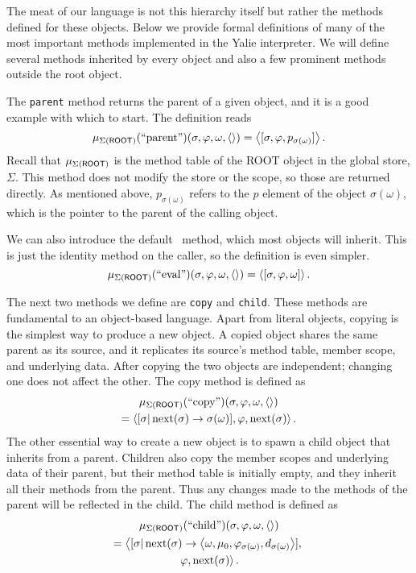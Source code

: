 \documentclass[twocolumn]{article}
\begin{document}
The meat of our language is not this hierarchy itself but rather the
methods defined for these objects. Below we provide formal definitions
of many of the most important methods implemented in the Yalie
interpreter. We will define several methods inherited by every object
and also a few prominent methods outside the root object.

The \texttt{parent} method returns the parent of a given object, and
it is a good example with which to start. The definition reads
\[ \mu_{\Sigma(\text{\sf ROOT})}(\text{``parent''})(\sigma,\varphi,\omega,
\left<\right>) = \left< [\sigma,\varphi,p_{\sigma(\omega)}] \right>. \] Recall that
$\mu_{\Sigma(\text{\sf ROOT})}$ is the method table of the {\ptr ROOT}
object in the global store, $\Sigma$. This method does not modify the
store or the scope, so those are returned directly. As mentioned
above, $p_{\sigma(\omega)}$ refers to the $p$ element of the object
$\sigma(\omega)$, which is the pointer to the parent of the calling
object.

We can also introduce the default \eval\ method, which most objects
will inherit. This is just the identity method on the caller, so the
definition is even simpler.
\[ \mu_{\Sigma(\text{\sf ROOT})}(\text{``eval''})(\sigma,\varphi,\omega,
\left<\right>) = \left< [\sigma,\varphi,\omega] \right>. \]

The next two methods we define are \texttt{copy} and
\texttt{child}. These methods are fundamental to an object-based
language. Apart from literal objects, copying is the simplest way to
produce a new object. A copied object shares the same parent as its
source, and it replicates its source's method table, member scope, and
underlying data. After copying the two objects are independent;
changing one does not affect the other. The copy method is defined as
\begin{multline*}
  \mu_{\Sigma(\text{\sf ROOT})}(\text{``copy''})(\sigma,\varphi,\omega,
\left<\right>) \\ = \left< [\sigma|\operatorname{next}(\sigma)\rightarrow\sigma(\omega)],\varphi,
\operatorname{next}(\sigma)\right>.
\end{multline*}
The other essential way to create a new object is to spawn a child
object that inherits from a parent. Children also copy the member
scopes and underlying data of their parent, but their method table is
initially empty, and they inherit all their methods from the
parent. Thus any changes made to the methods of the parent will be
reflected in the child. The child method is defined as
\begin{multline*}
  \mu_{\Sigma(\text{\sf ROOT})}(\text{``child''})(\sigma,\varphi,\omega,
  \left<\right>) \\ = \left< [\sigma|\operatorname{next}(\sigma)\rightarrow \left< \omega, \mu_0,
  \varphi_{\sigma(\omega)}, d_{\sigma(\omega)}\right>],\right.\\\left.\varphi,
  \operatorname{next}(\sigma)\right>.
\end{multline*}
\end{document}
